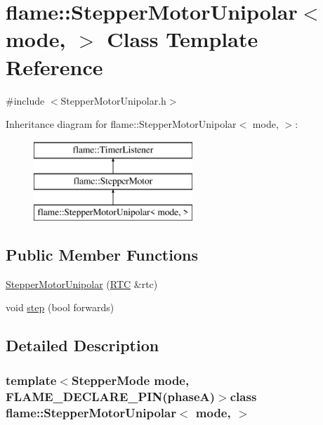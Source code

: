 \hypertarget{classflame_1_1_stepper_motor_unipolar}{\section{flame\-:\-:Stepper\-Motor\-Unipolar$<$ mode, $>$ Class Template Reference}
\label{classflame_1_1_stepper_motor_unipolar}
}


{\ttfamily \#include $<$Stepper\-Motor\-Unipolar.\-h$>$}

Inheritance diagram for flame\-:\-:Stepper\-Motor\-Unipolar$<$ mode, $>$\-:\begin{figure}[H]
\begin{center}
\leavevmode
\includegraphics[height=3.000000cm]{classflame_1_1_stepper_motor_unipolar}
\end{center}
\end{figure}
\subsection*{Public Member Functions}
\begin{DoxyCompactItemize}
\item 
\hyperlink{classflame_1_1_stepper_motor_unipolar_af690093f238136417f9b051fadd62f28}{Stepper\-Motor\-Unipolar} (\hyperlink{classflame_1_1_r_t_c}{R\-T\-C} \&rtc)
\item 
void \hyperlink{classflame_1_1_stepper_motor_unipolar_ace9ef8057a4a7cb6aa13db88c6a0ef4a}{step} (bool forwards)
\end{DoxyCompactItemize}


\subsection{Detailed Description}
\subsubsection*{template$<$Stepper\-Mode mode, F\-L\-A\-M\-E\-\_\-\-D\-E\-C\-L\-A\-R\-E\-\_\-\-P\-I\-N(phase\-A)$>$class flame\-::\-Stepper\-Motor\-Unipolar$<$ mode, $>$}

